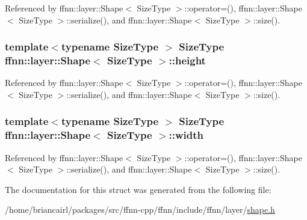 Referenced by ffnn\-::layer\-::\-Shape$<$ Size\-Type $>$\-::operator=(), ffnn\-::layer\-::\-Shape$<$ Size\-Type $>$\-::serialize(), and ffnn\-::layer\-::\-Shape$<$ Size\-Type $>$\-::size().

\hypertarget{structffnn_1_1layer_1_1_shape_a96608d7bcef7733a1b1f4782827a0c78}{
\subsubsection[{height}]{\setlength{\rightskip}{0pt plus 5cm}template$<$typename Size\-Type $>$ Size\-Type {\bf ffnn\-::layer\-::\-Shape}$<$ Size\-Type $>$\-::height}}\label{structffnn_1_1layer_1_1_shape_a96608d7bcef7733a1b1f4782827a0c78}


Referenced by ffnn\-::layer\-::\-Shape$<$ Size\-Type $>$\-::operator=(), ffnn\-::layer\-::\-Shape$<$ Size\-Type $>$\-::serialize(), and ffnn\-::layer\-::\-Shape$<$ Size\-Type $>$\-::size().

\hypertarget{structffnn_1_1layer_1_1_shape_a860cbac53d9e20bdf8283298c6369cbc}{
\subsubsection[{width}]{\setlength{\rightskip}{0pt plus 5cm}template$<$typename Size\-Type $>$ Size\-Type {\bf ffnn\-::layer\-::\-Shape}$<$ Size\-Type $>$\-::width}}\label{structffnn_1_1layer_1_1_shape_a860cbac53d9e20bdf8283298c6369cbc}


Referenced by ffnn\-::layer\-::\-Shape$<$ Size\-Type $>$\-::operator=(), ffnn\-::layer\-::\-Shape$<$ Size\-Type $>$\-::serialize(), and ffnn\-::layer\-::\-Shape$<$ Size\-Type $>$\-::size().



The documentation for this struct was generated from the following file\-:\begin{DoxyCompactItemize}
\item 
/home/briancairl/packages/src/ffnn-\/cpp/ffnn/include/ffnn/layer/\hyperlink{shape_8h}{shape.\-h}\end{DoxyCompactItemize}
